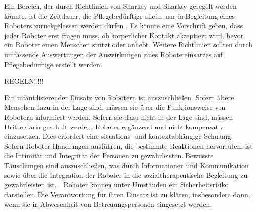 Ein Bereich, der durch Richtlinien von Sharkey und Sharkey geregelt werden könnte, ist die Zeitdauer, die Pflegebedürftige allein, nur in Begleitung eines Roboters zurückgelassen werden dürfen \cite[38]{sharky}. Es könnte eine Vorschrift geben, dass jeder Roboter erst fragen muss, ob körperlicher Kontakt akzeptiert wird, bevor ein Roboter einen Menschen stützt oder anhebt.
Weitere Richtlinien sollten durch umfassende Auswertungen der Auswirkungen eines Robotereinsatzes auf Pflegebedürftige erstellt werden.











   


REGELN!!!!!

Ein infantilisierender Einsatz von Robotern ist auszuschließen. Sofern ältere Menschen dazu in der Lage sind, müssen sie über die Funktionsweise von Robotern informiert werden. Sofern sie dazu nicht in der Lage sind, müssen Dritte darin geschult werden, Roboter ergänzend und nicht kompensativ einzusetzen. Dies erfordert eine situations- und kontextabhängige Schulung.  
Sofern Roboter Handlungen ausführen, die bestimmte Reaktionen hervorrufen, ist die Intimität und Integrität der Personen zu gewährleisten. Bewusste Täuschungen sind auszuschließen, was durch Informationen und Kommunikation sowie über die Integration der Roboter in die sozialtherapeutische Begleitung zu gewährleisten ist.  
Roboter können unter Umständen ein Sicherheitsrisiko darstellen. Die Verantwortung für ihren Einsatz ist zu klären, insbesondere dann, wenn sie in Abwesenheit von Betreuungspersonen eingesetzt werden.  

